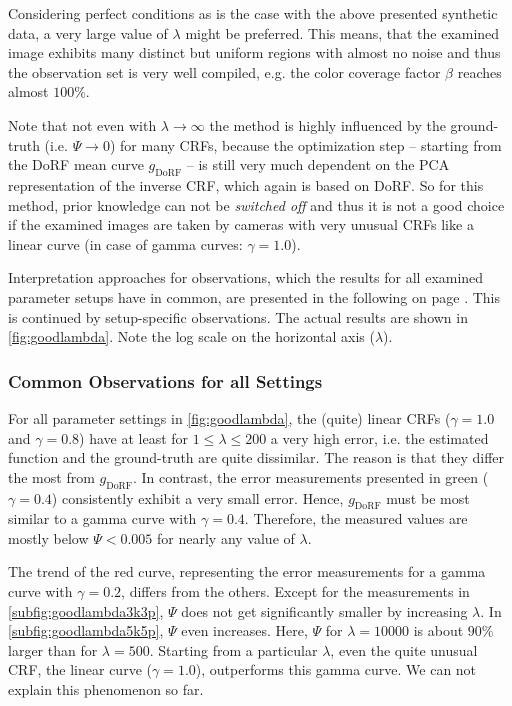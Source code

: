Considering perfect conditions as is the case with the above presented synthetic data, a very large value of $\lambda$ might be preferred. This means, that the examined image exhibits many distinct but uniform regions with almost no noise and thus the observation set is very well compiled, \hbox{e.g.} the color coverage factor $\beta$ reaches almost $100 \%$. 

Note that not even with $\lambda \rightarrow \infty$ the method is highly influenced by the ground-truth (\hbox{i.e.} $\Psi \rightarrow 0$) for many CRFs, because the optimization step -- starting from the DoRF mean curve $g_\text{DoRF}$ -- is still very much dependent on the PCA representation of the inverse CRF, which again is based on DoRF. So for this method, prior knowledge can not be \emph{switched off} and thus it is not a good choice if the examined images are taken by cameras with very unusual CRFs like a linear curve (in case of gamma curves: $\gamma = 1.0$).

Interpretation approaches for observations, which the results for all examined parameter setups have in common, are presented in the following on page \pageref{subsubsec:commonobservations}. This is continued by setup-specific observations. The actual results are shown in \autoref{fig:goodlambda}. Note the log scale on the horizontal axis ($\lambda$).



\clearpage

\subsubsection{Common Observations for all Settings}
\label{subsubsec:commonobservations}

For all parameter settings in \autoref{fig:goodlambda}, the (quite) linear CRFs ($\gamma = 1.0$ and $\gamma = 0.8$) have at least for $1 \leq \lambda \leq 200$ a very high error, \hbox{i.e.} the estimated function and the ground-truth are quite dissimilar. The reason is that they differ the most from $g_\text{DoRF}$. In contrast, the error measurements presented in green ($\gamma = 0.4$) consistently exhibit a very small error. Hence, $g_\text{DoRF}$ must be most similar to a gamma curve with $\gamma = 0.4$. Therefore, the measured values are mostly below $\Psi < 0.005$ for nearly any value of $\lambda$.

The trend of the red curve, representing the error measurements for a gamma curve with $\gamma = 0.2$, differs from the others. Except for the measurements in \autoref{subfig:goodlambda3k3p}, $\Psi$ does not get significantly smaller by increasing $\lambda$. In \autoref{subfig:goodlambda5k5p}, $\Psi$ even increases. Here, $\Psi$ for $\lambda = 10000$ is about $90\%$ larger than for $\lambda = 500$. Starting from a particular $\lambda$, even the quite unusual CRF, the linear curve ($\gamma = 1.0$), outperforms this gamma curve. We can not explain this phenomenon so far. 


